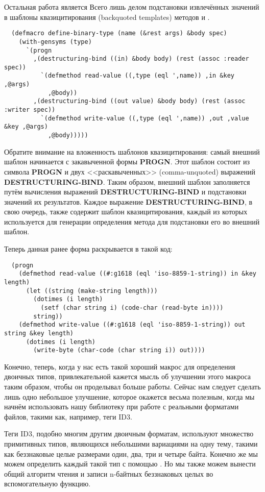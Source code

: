 Остальная работа является Всего лишь делом подстановки извлечённых значений в шаблоны
квазицитирования (backquoted templates) методов  и .

\begin{lstlisting}
  (defmacro define-binary-type (name (&rest args) &body spec)
    (with-gensyms (type)
      `(progn
        ,(destructuring-bind ((in) &body body) (rest (assoc :reader spec))
          `(defmethod read-value ((,type (eql ',name)) ,in &key ,@args)
            ,@body))
        ,(destructuring-bind ((out value) &body body) (rest (assoc :writer spec))
          `(defmethod write-value ((,type (eql ',name)) ,out ,value &key ,@args)
            ,@body)))))
\end{lstlisting}

Обратите внимание на вложенность шаблонов квазицитирования: самый внешний шаблон
начинается с закавыченной формы \textbf{PROGN}. Этот шаблон состоит из символа
\textbf{PROGN} и двух <<раскавыченных>> (comma-unquoted) выражений
\textbf{DESTRUCTURING-BIND}. Таким образом, внешний шаблон заполняется путём вычисления
выражений \textbf{DESTRUCTURING-BIND} и подстановки значений их результатов. Каждое
выражение \textbf{DESTRUCTURING-BIND}, в свою очередь, также содержит шаблон
квазицитирования, каждый из которых используется для генерации определения метода для
подстановки его во внешний шаблон.

Теперь данная ранее форма  раскрывается в такой код:

\begin{lstlisting}
  (progn
    (defmethod read-value ((#:g1618 (eql 'iso-8859-1-string)) in &key length)
      (let ((string (make-string length)))
        (dotimes (i length)
          (setf (char string i) (code-char (read-byte in))))
        string))
    (defmethod write-value ((#:g1618 (eql 'iso-8859-1-string)) out string &key length)
      (dotimes (i length)
        (write-byte (char-code (char string i)) out))))
\end{lstlisting}

Конечно, теперь, когда у нас есть такой хороший макрос для определения двоичных типов,
привлекательной кажется мысль об улучшении этого макроса таким образом, чтобы он
проделывал больше работы. Сейчас нам следует сделать лишь одно небольшое улучшение,
которое окажется весьма полезным, когда мы начнём использовать нашу библиотеку при работе
с реальными форматами файлов, такими как, например, теги ID3.

Теги ID3, подобно многим другим двоичным форматам, используют множество примитивных типов,
являющихся небольшими вариациями на одну тему, такими как беззнаковые целые размерами
один, два, три и четыре байта. Конечно же мы можем определить каждый такой тип с помощью
. Но мы также можем вынести общий алгоритм чтения и записи
n-байтных беззнаковых целых во вспомогательную функцию.

